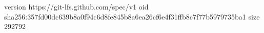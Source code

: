 version https://git-lfs.github.com/spec/v1
oid sha256:357fd00dc639b8a0f94c6d8fe845b8a6ea26cf6e4f31ffb8c7f77b5979735ba1
size 292792
